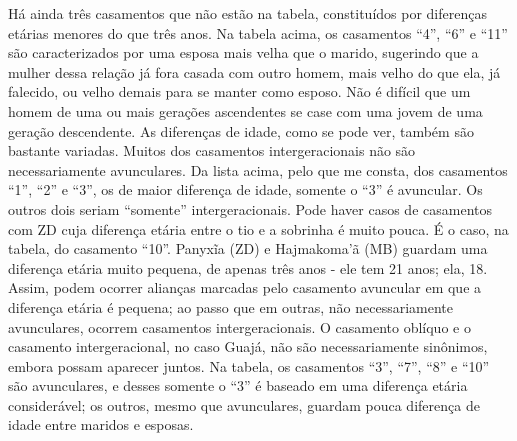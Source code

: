 Há ainda três casamentos que não estão na tabela, constituídos por
diferenças etárias menores do que três anos. Na tabela acima, os
casamentos ``4'', ``6'' e ``11'' são caracterizados por uma esposa mais
velha que o marido, sugerindo que a mulher dessa relação já fora casada
com outro homem, mais velho do que ela, já falecido, ou velho demais
para se manter como esposo. Não é difícil que um homem de uma ou mais
gerações ascendentes se case com uma jovem de uma geração descendente.
As diferenças de idade, como se pode ver, também são bastante variadas.
Muitos dos casamentos intergeracionais não são necessariamente
avunculares. Da lista acima, pelo que me consta, dos casamentos ``1'',
``2'' e ``3'', os de maior diferença de idade, somente o ``3'' é
avuncular. Os outros dois seriam ``somente'' intergeracionais. Pode haver
casos de casamentos com ZD cuja diferença etária entre o tio e a
sobrinha é muito pouca. É o caso, na tabela, do casamento ``10''. Panyxĩa
(ZD) e Hajmakoma'ã (MB) guardam uma diferença etária muito pequena, de
apenas três anos - ele tem 21 anos; ela, 18. Assim, podem ocorrer
alianças marcadas pelo casamento avuncular em que a diferença etária é
pequena; ao passo que em outras, não necessariamente avunculares,
ocorrem casamentos intergeracionais. O casamento oblíquo e o casamento
intergeracional, no caso Guajá, não são necessariamente sinônimos,
embora possam aparecer juntos. Na tabela, os casamentos ``3'', ``7'', ``8'' e
``10'' são avunculares, e desses somente o ``3'' é baseado em uma diferença
etária considerável; os outros, mesmo que avunculares, guardam pouca
diferença de idade entre maridos e esposas.

